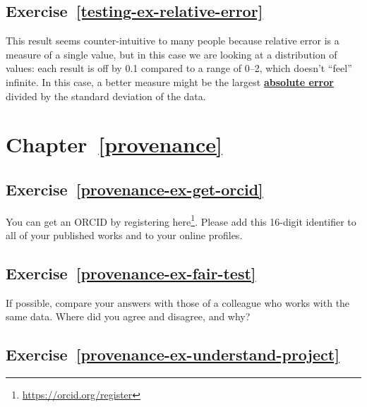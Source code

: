 \documentclass[
]{krantz}
\renewcommand{\href}[2]{#2\footnote{\url{#1}}}
\newcommand{\gref}[2]{\hyperlink{#2}{\textbf{#1}}}
\begin{document}
\hypertarget{exercise-reftesting-ex-relative-error}{%
\subsection*{Exercise~\ref{testing-ex-relative-error}}\label{exercise-reftesting-ex-relative-error}}


This result seems counter-intuitive to many people because relative error is a measure of a single value,
but in this case we are looking at a distribution of values:
each result is off by 0.1 compared to a range of 0--2,
which doesn't ``feel'' infinite.
In this case,
a better measure might be the largest \gref{absolute error}{absolute\_error}
divided by the standard deviation of the data.

\hypertarget{chapter-refprovenance}{%
\section*{Chapter~\ref{provenance}}\label{chapter-refprovenance}}

\hypertarget{exercise-refprovenance-ex-get-orcid}{%
\subsection*{Exercise~\ref{provenance-ex-get-orcid}}\label{exercise-refprovenance-ex-get-orcid}}


You can get an ORCID by registering \href{https://orcid.org/register}{here}.
Please add this 16-digit identifier to all of your published works
and to your online profiles.

\hypertarget{exercise-refprovenance-ex-fair-test}{%
\subsection*{Exercise~\ref{provenance-ex-fair-test}}\label{exercise-refprovenance-ex-fair-test}}


If possible,
compare your answers with those of a colleague who works with the same data.
Where did you agree and disagree, and why?

\hypertarget{exercise-refprovenance-ex-understand-project}{%
\subsection*{Exercise~\ref{provenance-ex-understand-project}}\label{exercise-refprovenance-ex-understand-project}}
\end{document}
